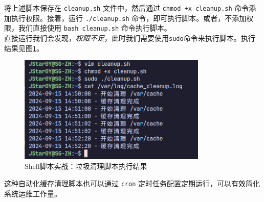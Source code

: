 将上述脚本保存在 \texttt{cleanup.sh} 文件中，然后通过 \texttt{chmod +x cleanup.sh} 命令添加执行权限。接着，运行 \texttt{./cleanup.sh} 命令，即可执行脚本。或者，不添加权限，我们直接使用 \texttt{bash cleanup.sh} 命令执行脚本。\\

直接运行我们会发现，\textit{权限不足}，此时我们需要使用\texttt{sudo}命令来执行脚本。执行结果见图\ref{fig:shellscript3}。

\begin{figure}[htbp]
    \centering
    \includegraphics[width=0.8\textwidth]{Figures/cleanup_shell.png}
    \caption{Shell脚本实战：垃圾清理脚本执行结果}
    \label{fig:shellscript3}
\end{figure}

这种自动化缓存清理脚本也可以通过 \texttt{cron} 定时任务配置定期运行，可以有效简化系统运维工作量。